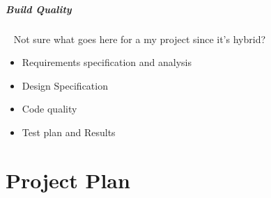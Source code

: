 \subparagraph{Build Quality}~
Not sure what goes here for a my project since it's hybrid? 
\begin{itemize}
	\item Requirements specification and analysis
	\item Design Specification 
	\item Code quality
	\item Test plan and Results
\end{itemize}

\clearpage

\section{Project Plan}
\noindent
{}
